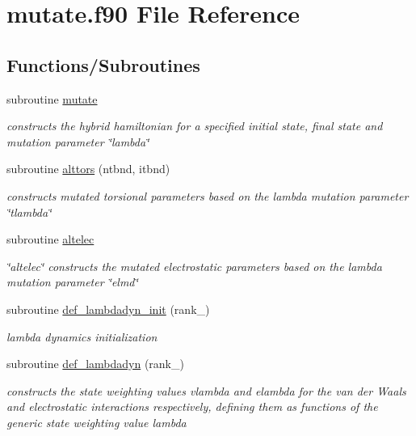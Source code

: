 \hypertarget{mutate_8f90}{\section{mutate.\-f90 File Reference}
\label{mutate_8f90}
}
\subsection*{Functions/\-Subroutines}
\begin{DoxyCompactItemize}
\item 
subroutine \hyperlink{mutate_8f90_a8dde235f5fdcedb8cd883819512bd603}{mutate}
\begin{DoxyCompactList}\small\item\em constructs the hybrid hamiltonian for a specified initial state, final state and mutation parameter \char`\"{}lambda\char`\"{} \end{DoxyCompactList}\item 
subroutine \hyperlink{mutate_8f90_a72bb5139e5d6b4dcde377c98583dcbd0}{alttors} (ntbnd, itbnd)
\begin{DoxyCompactList}\small\item\em constructs mutated torsional parameters based on the lambda mutation parameter \char`\"{}tlambda\char`\"{} \end{DoxyCompactList}\item 
subroutine \hyperlink{mutate_8f90_a8a0c3ee7abe7f5d00402933102f15a81}{altelec}
\begin{DoxyCompactList}\small\item\em \char`\"{}altelec\char`\"{} constructs the mutated electrostatic parameters based on the lambda mutation parameter \char`\"{}elmd\char`\"{} \end{DoxyCompactList}\item 
subroutine \hyperlink{mutate_8f90_a8be1b330945fbe05be53c8ef7834d6bd}{def\-\_\-lambdadyn\-\_\-init} (rank\-\_\-)
\begin{DoxyCompactList}\small\item\em lambda dynamics initialization \end{DoxyCompactList}\item 
subroutine \hyperlink{mutate_8f90_a8a8cb37784baa7e9e5bda6dae37df036}{def\-\_\-lambdadyn} (rank\-\_\-)
\begin{DoxyCompactList}\small\item\em constructs the state weighting values vlambda and elambda for the van der Waals and electrostatic interactions respectively, defining them as functions of the generic state weighting value lambda \end{DoxyCompactList}\item 

\end{DoxyCompactItemize}

